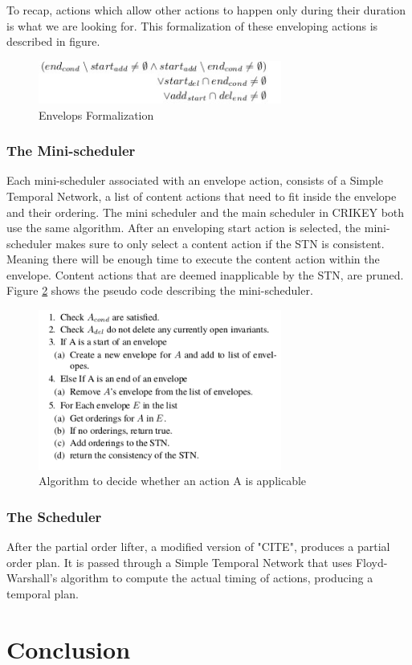\documentclass
[a4paper
,english
,parskip=half
,bibliography=totoc
]{scrreprt}
\begin{document}
          To recap, actions which allow other actions to happen only during their duration is what we are looking for. This formalization of these enveloping actions is described in figure.
          \begin{figure}[h]
            \centering    
            \includegraphics[width=8cm]{envelops.jpg}
            \caption{Envelops Formalization}
             \label{fig:envelops}
        \end{figure}


        \subsubsection{The Mini-scheduler}
        Each mini-scheduler associated with an envelope action, consists of a Simple Temporal Network, a list of content actions that need to fit inside the envelope and their ordering. The mini scheduler and the main scheduler in CRIKEY both use the same algorithm. After an enveloping start action is selected, the mini-scheduler makes sure to only select a content action if the STN is consistent. Meaning there will be enough time to execute the content action within the envelope. Content actions that are deemed inapplicable by the STN, are pruned. Figure \ref{fig:algorithm} shows the pseudo code describing the mini-scheduler.
        \begin{figure}[h]
            \centering    
            \includegraphics[width=8cm]{sched_algorithm.png}
            \caption{Algorithm to decide whether an action A is applicable}
             \label{fig:algorithm}
        \end{figure}

        \subsubsection{The Scheduler}
        After the partial order lifter, a modified version of "CITE", produces a partial order plan. It is passed through a Simple Temporal Network that uses Floyd-Warshall's algorithm to compute the actual timing of actions, producing a temporal plan.

    \section{Conclusion} 






\end{document}
